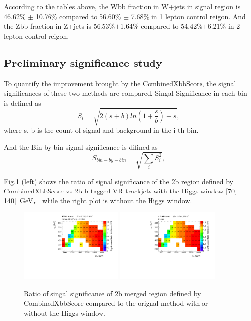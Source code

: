 \par According to the tables above, the Wbb fraction in W+jets in signal region is 46.62\% $\pm$ 10.76\% compared to 56.60\% $\pm$ 7.68\% in 1 lepton control reigon. 
And the Zbb fraction in Z+jets is 56.53\%$\pm$1.64\% compared to 54.42\%$\pm$6.21\% in 2 lepton control reigon.

\subsection{Preliminary significance study}

\par To quantify the improvement brought by the CombinedXbbScore, the signal significances of these two methods are compared.
Singal Significance in each bin is defined as
\begin{equation}
    S_i = \sqrt{2(s + b)ln(1 + \frac{s}{b}) − s},
\end{equation}
where s, b is the count of signal and background in the i-th bin.

\par And the Bin-by-bin signal significance is difined as
\begin{equation}
    S_{bin-by-bin} = \sqrt{\sum_i S_i^2}, 
\end{equation}

\par Fig.\ref{fig:ss_ratio} (left) shows the ratio of signal significance of the 2b region defined by CombinedXbbScore vs 2b b-tagged VR trackjets with the Higgs window [70, 140]~GeV，
while the right plot is without the Higgs window.
\begin{figure}[h]
    \centering
    \includegraphics[width=0.45\textwidth]{appendices/figures/2b-tags_XbbScoreoverVR_HiggsWindow.pdf}
    \includegraphics[width=0.45\textwidth]{appendices/figures/2b-tags_XbbScoreoverVR.pdf}
    \caption{Ratio of singal significance of 2b merged region defined by CombinedXbbScore compared to the orignal method with or without the Higgs window.}
    \label{fig:ss_ratio}
\end{figure}
